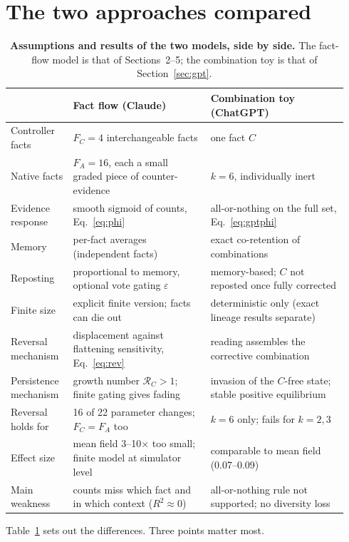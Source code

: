 \documentclass[10pt,a4paper]{article}
\begin{document}
\section{The two approaches compared}
\begin{table}[h]
\centering\footnotesize
\caption{\textbf{Assumptions and results of the two models, side by side.} The fact-flow model is that of
Sections~2--5; the combination toy is that of Section~\ref{sec:gpt}.}
\label{tab:compare}
\begin{tabular}{@{}p{0.17\linewidth}p{0.385\linewidth}p{0.385\linewidth}@{}}\toprule
 & \textbf{Fact flow (Claude)} & \textbf{Combination toy (ChatGPT)}\\\midrule
Controller facts & $F_C=4$ interchangeable facts & one fact $C$\\[2pt]
Native facts & $F_A=16$, each a small graded piece of counter-evidence & $k=6$, individually inert\\[2pt]
Evidence response & smooth sigmoid of counts, Eq.~\eqref{eq:phi} & all-or-nothing on the full set, Eq.~\eqref{eq:gptphi}\\[2pt]
Memory & per-fact averages (independent facts) & exact co-retention of combinations\\[2pt]
Reposting & proportional to memory, optional vote gating $\varepsilon$ & memory-based; $C$ not reposted once fully corrected\\[2pt]
Finite size & explicit finite version; facts can die out & deterministic only (exact lineage results separate)\\[2pt]
Reversal mechanism & displacement against flattening sensitivity, Eq.~\eqref{eq:rev} & reading assembles the corrective combination\\[2pt]
Persistence mechanism & growth number $\mathcal R_C>1$; finite gating gives fading & invasion of the $C$-free state; stable positive equilibrium\\[2pt]
Reversal holds for & 16 of 22 parameter changes; $F_C=F_A$ too & $k=6$ only; fails for $k=2,3$\\[2pt]
Effect size & mean field 3--10$\times$ too small; finite model at simulator level & comparable to mean field (0.07--0.09)\\[2pt]
Main weakness & counts miss which fact and in which context ($R^2\approx0$) & all-or-nothing rule not supported; no diversity loss\\\bottomrule
\end{tabular}
\end{table}
Table~\ref{tab:compare} sets out the differences. Three points matter most.
\end{document}
